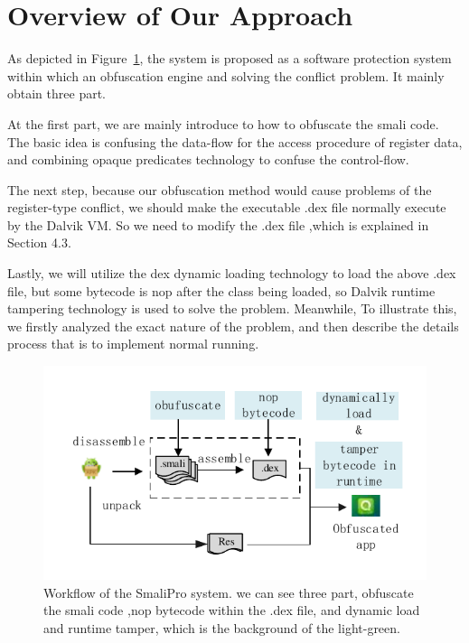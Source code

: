 \section{Overview of Our Approach}
As depicted in Figure~\ref{fig:Figure 4}, the system is proposed as a software protection system within which an obfuscation engine and solving the conflict problem. It mainly obtain three part.

At the first part, we are mainly introduce to how to obfuscate the smali code. The basic idea is confusing the data-flow for the access procedure of register data, and combining opaque predicates technology to confuse the control-flow.

The next step, because our obfuscation method would cause problems of the register-type conflict, we should make the executable .dex file normally execute by the Dalvik VM. So we need to modify the .dex file ,which is  explained in Section 4.3.

Lastly, we will utilize the dex dynamic loading technology to load the above .dex file, but some bytecode is nop after the class being loaded, so Dalvik runtime tampering technology is used to solve the problem. Meanwhile, To illustrate this, we firstly analyzed the exact nature of the problem, and then describe the details process that is to implement normal running.


\begin{figure}[!tbp]
  \centering
  \includegraphics[width=1\columnwidth]{fig/fig4.pdf}
  \caption{Workflow of the SmaliPro system. we can see three part, obfuscate the smali code ,nop bytecode within the .dex file, and dynamic load and runtime tamper, which is the background of the light-green.}\label{fig:Figure 4}
\end{figure}


